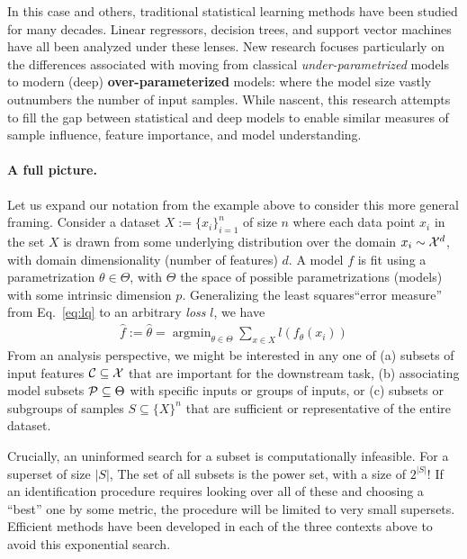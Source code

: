 In this case and others, traditional statistical learning methods 
have been studied 
for many decades.
Linear regressors, decision trees, and support vector machines
have all been analyzed under these lenses.
New research focuses
particularly on the differences
associated with moving from classical \textit{under-parametrized} models to
modern (deep) \textbf{over-parameterized} models: where
the model size vastly outnumbers the number
of input samples.
While nascent, this research
attempts to fill the gap between
statistical and deep models to enable similar measures of sample influence, feature importance, and model understanding. 

\paragraph{A full picture.}
Let us expand our notation from the example above to consider this more general framing.
Consider a dataset $X:=\{x_i\}_{i=1}^n$ of size $n$ where each data point $x_i$ in the set $X$ is drawn from some underlying distribution over the domain $x_i \sim \mathcal{X}^d$, 
with domain dimensionality (number of features) $d$.
A model $f$ is fit using a parametrization $\theta \in \Theta$,
with $\Theta$ the space of possible parametrizations (models) with some intrinsic dimension $p$. 
Generalizing the least squares``error measure'' from Eq.~\ref{eq:lq} to an arbitrary \textit{loss} $l$, we have
\begin{align}\label{eq:learning}
    \hat{f}:=\hat{\theta} = \mathop{\arg\min}_{\theta\in\Theta} \sum_{x \in X} l(f_\theta(x_i))
\end{align}
From an analysis perspective, 
we might be interested in any one of 
(a) subsets of input features $\mathcal{C} \subseteq \mathcal{X}$ that are important for the downstream task,
(b) associating model subsets $\mathcal{P} \subseteq \Theta$ with specific inputs or groups of inputs, or 
(c) subsets or subgroups of samples $S \subseteq \{X\}^n$ that are sufficient or representative of the entire dataset.

Crucially, an uninformed search for a subset is computationally infeasible. For a superset of size $|S|$, The set of all subsets is the power set, with a size of $2^{|S|}$! If an identification procedure requires looking over all of these and choosing a ``best'' one by some metric, the procedure will be limited to very small supersets.
Efficient methods have been developed in each of the three contexts above to avoid this exponential search.


